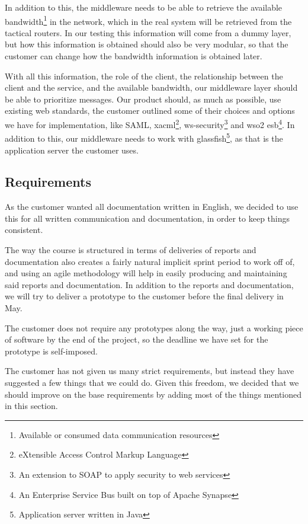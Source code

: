     In addition to this, the middleware needs to be able to retrieve the available \gls{bandwidth}\footnote{Available or consumed data communication resources} in the network, which in the real system will be retrieved from the tactical routers. In our testing this information will come from a dummy layer, but how this information is obtained should also be very modular, so that the customer can change how the bandwidth information is obtained later.

    With all this information, the role of the client, the relationship between the client and the service, and the available bandwidth, our middleware layer should be able to prioritize messages. Our product should, as much as possible, use existing web standards, the customer outlined some of their choices and options we have for implementation, like SAML, \gls{xacml}\footnote{eXtensible Access Control Markup Language}, \gls{ws-security}\footnote{An extension to SOAP to apply security to web services} and \gls{wso2 esb}\footnote{An Enterprise Service Bus built on top of Apache Synapse}. In addition to this, our middleware needs to work with \gls{glassfish}\footnote{Application server written in Java }, as that is the application server the customer uses.
   
    \subsection{Requirements}\label{Requirements}
    As the customer wanted all documentation written in English, we decided to use this for all written communication and documentation, in order to keep things consistent.
    
    The way the course is structured in terms of deliveries of reports and documentation also creates a fairly natural implicit sprint period to work off of, and using an agile methodology will help in easily producing and maintaining said reports and documentation. In addition to the  reports and documentation, we will try to deliver a prototype to the customer before the final delivery in May.

    The customer does not require any prototypes along the way, just a working piece of software by the end of the project, so the deadline we have set for the prototype is self-imposed. 

    The customer has not given us many strict requirements, but instead they have suggested a few things that we could do. Given this freedom, we decided that we should improve on the base requirements by adding most of the things mentioned in this section. 

